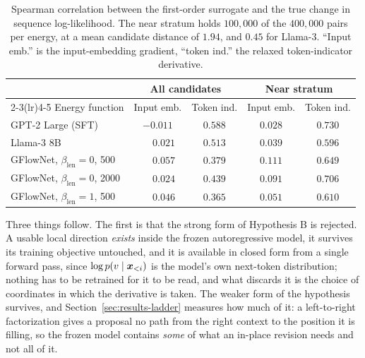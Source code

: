 \begin{table}[htbp]
    \centering
    \small
    \setlength{\tabcolsep}{4pt}
    \begin{tabular}{lcccc}
        \toprule
        & \multicolumn{2}{c}{All candidates} & \multicolumn{2}{c}{Near stratum} \\
        \cmidrule(lr){2-3}\cmidrule(lr){4-5}
        Energy function & Input emb. & Token ind. & Input emb. & Token ind. \\
        \midrule
        GPT-2 Large (SFT)                     & $-0.011$ & $\mathbf{0.588}$ & $0.028$ & $\mathbf{0.730}$ \\
        Llama-3 8B                            & $\phantom{-}0.021$ & $\mathbf{0.513}$ & $0.039$ & $\mathbf{0.596}$ \\
        GFlowNet, $\beta_{\text{len}} = 0$, 500  & $\phantom{-}0.057$ & $\mathbf{0.379}$ & $0.111$ & $\mathbf{0.649}$ \\
        GFlowNet, $\beta_{\text{len}} = 0$, 2000 & $\phantom{-}0.024$ & $\mathbf{0.439}$ & $0.091$ & $\mathbf{0.706}$ \\
        GFlowNet, $\beta_{\text{len}} = 1$, 500  & $\phantom{-}0.046$ & $\mathbf{0.365}$ & $0.051$ & $\mathbf{0.610}$ \\
        \bottomrule
    \end{tabular}
    \caption[Linearization quality of the input-embedding against the token-indicator derivative.]{Spearman correlation between the first-order surrogate and the true change in sequence log-likelihood. The near stratum holds $100{,}000$ of the $400{,}000$ pairs per energy, at a mean candidate distance of $1.94$, and $0.45$ for Llama-3. ``Input emb.'' is the input-embedding gradient, ``token ind.'' the relaxed token-indicator derivative.}
    \label{tab:onehot}
\end{table}

Three things follow. The first is that the strong form of Hypothesis B is rejected. A usable local direction \emph{exists} inside the frozen autoregressive model, it survives its training objective untouched, and it is available in closed form from a single forward pass, since $\log p(v \mid \bm{x}_{<i})$ is the model's own next-token distribution; nothing has to be retrained for it to be read, and what discards it is the choice of coordinates in which the derivative is taken. The weaker form of the hypothesis survives, and Section~\ref{sec:results-ladder} measures how much of it: a left-to-right factorization gives a proposal no path from the right context to the position it is filling, so the frozen model contains \emph{some} of what an in-place revision needs and not all of it.

